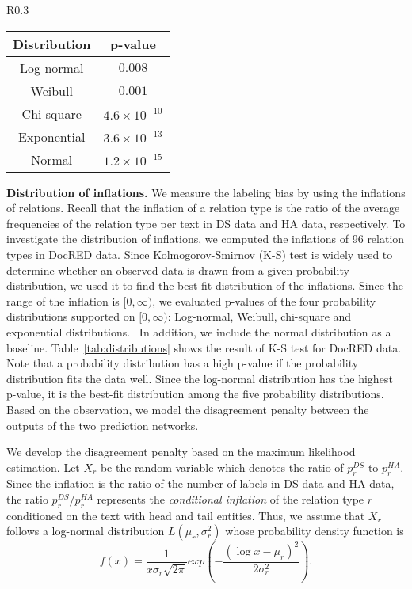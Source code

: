 \documentclass[11pt]{article}
\newcommand{\minisection}[1]{\vspace{0.03in}{\bf \noindent #1.} }
\newcommand{\lognormal}[2]{{L}(#1, #2)}
\newcommand{\fracsmall}[2]{#1/#2}
\begin{document}
\begin{wraptable}{R}{0.3\textwidth}
	\caption{The result of K-S test}
	\label{tab:distributions}
	\small
	\begin{tabular}{c|c}
		\toprule
		\textbf{Distribution}  & \textbf{p-value} \\
		\midrule
		Log-normal&{$0.008$}\\
		Weibull & $0.001$ \\
		Chi-square & $4.6 \times 10^{-10}$ \\
		Exponential & $3.6 \times 10^{-13}$ \\
		Normal& $1.2\times 10^{-15}$\\  
		\bottomrule
	\end{tabular}
\end{wraptable}
\noindent\textbf{Distribution of inflations.}
We measure the labeling bias by using the inflations of relations.
Recall that the inflation of a relation type is the ratio of the average frequencies of the relation type per text in DS data and HA data, respectively.
To investigate the distribution of inflations, we computed the inflations of 96 relation types in DocRED data.
Since Kolmogorov-Smirnov (K-S) test \cite{massey1951kolmogorov} is widely used to determine whether an observed data is drawn from a given probability distribution, we used it to find the best-fit distribution of the inflations.
Since the range of the inflation is $[0,\infty)$, we evaluated p-values of the four probability distributions supported on  $[0,\infty)$: Log-normal, Weibull, chi-square and exponential distributions. \
In addition, we include the normal distribution as a baseline.
Table~\ref{tab:distributions} shows the result of K-S test for DocRED data.
Note that a probability distribution has a high p-value if the probability distribution fits the data well.
Since the log-normal distribution has the highest p-value, it is the best-fit distribution among the five probability distributions.
Based on the observation, we model the disagreement penalty between the outputs of the two prediction networks. 



\minisection{Modeling the disagreement penalty}
We develop the disagreement penalty based on the maximum likelihood estimation.
Let $X_r$ be the random variable which denotes the ratio of $p^{DS}_{r}$ to $p^{HA}_{r}$. 
Since the inflation is the ratio of the number of labels in DS data and HA data,
the ratio $\fracsmall{p^{DS}_{r}}{p^{HA}_{r}}$ represents the \emph{conditional inflation} of the relation type $r$ conditioned on the text with head and tail entities.
Thus, we assume that $X_r$ follows a log-normal distribution $\lognormal{\mu_r}{\sigma_r^2}$ whose probability density function is
\begin{equation}
	\label{eq:lognormal}
	f(x) = \frac{1}{x \sigma_r \sqrt{2\pi}} exp\left(-\frac{(\log{x}-\mu_r)^2}{2 \sigma_r^2} \right).
\end{equation}
\end{document}
